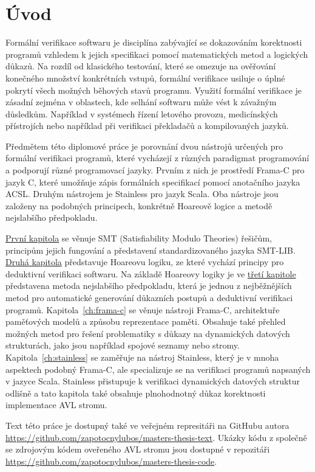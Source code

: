 \chapter*{Úvod}

Formální verifikace softwaru je disciplína zabývající se dokazováním korektnosti programů
vzhledem k jejich specifikaci pomocí matematických metod a logických důkazů.
Na rozdíl od klasického testování, které se omezuje na ověřování konečného množství konkrétních vstupů,
formální verifikace usiluje o úplné pokrytí všech možných běhových stavů programu.
Využití formální verifikace je zásadní zejména v oblastech,
kde selhání softwaru může vést k závažným důsledkům.
Například v systémech řízení letového provozu,
medicínských přístrojích nebo například při verifikaci překladačů a kompilovaných jazyků.

Předmětem této diplomové práce je porovnání dvou nástrojů určených pro formální verifikaci programů,
které vycházejí z různých paradigmat programování a podporují různé programovací jazyky.
Prvním z nich je prostředí Frama\mbox{-}C pro jazyk C,
které umožňuje zápis formálních specifikací pomocí anotačního jazyka ACSL\@.
Druhým nástrojem je Stainless pro jazyk Scala.
Oba nástroje jsou založeny na podobných principech,
konkrétně Hoareově logice a metodě nejslabšího předpokladu.

\hyperref[ch:smt]{První kapitola} se věnuje SMT (Satisfiability Modulo Theories) řešičům,
principům jejich fungování a představení standardizovaného jazyka SMT-LIB\@.
\hyperref[ch:hoareova-logika]{Druhá kapitola} představuje Hoareovu logiku,
ze které vychází principy pro deduktivní verifikaci softwaru.
Na základě Hoareovy logiky je ve \hyperref[ch:metoda-nejslabsiho-predpokladu]{třetí kapitole}
představena metoda nejslabšího předpokladu,
která je jednou z nejběžnějších metod pro automatické generování důkazních postupů
a deduktivní verifikaci programů.
Kapitola~\ref{ch:frama-c} se věnuje nástroji Frama\mbox{-}C,
architektuře paměťových modelů a způsobu reprezentace paměti.
Obsahuje také přehled možných metod pro řešení
problematiky s důkazy na dynamických datových strukturách,
jako jsou například spojové seznamy nebo stromy.
Kapitola~\ref{ch:stainless} se zaměřuje na nástroj Stainless,
který je v mnoha aspektech podobný Frama\mbox{-}C,
ale specializuje se na verifikaci programů napsaných v jazyce Scala.
Stainless přistupuje k verifikaci dynamických datových struktur
odlišně a tato kapitola také obsahuje plnohodnotný důkaz
korektnosti implementace AVL stromu.

\newpage

Text této práce je dostupný také ve veřejném represitáři na GitHubu autora
\url{https://github.com/zapotocnylubos/masters-thesis-text}.
Ukázky kódu z společně se zdrojovým kódem oveřeného AVL stromu
jsou dostupné v repozitáři \url{https://github.com/zapotocnylubos/masters-thesis-code}.
